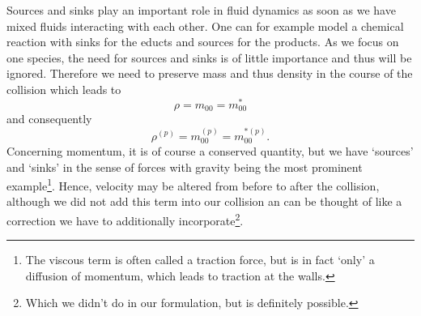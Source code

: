 Sources and sinks play an important role in fluid dynamics as soon as we have mixed fluids interacting with each other.
One can for example model a chemical reaction with sinks for the educts and sources for the products.
As we focus on one species, the need for sources and sinks is of little importance and thus will be ignored.
Therefore we need to preserve mass and thus density in the course of the collision which leads to
\begin{equation}
    \rho  = m_{00} = m_{00}^*
\end{equation}
and consequently
\begin{equation}
    \rho^{(p)} = m_{00}^{(p)} = m_{00}^{*(p)}.
\end{equation}
Concerning momentum, it is of course a conserved quantity, but we have `sources' and `sinks' in the sense of forces with gravity being the most prominent example\footnote{The viscous term is often called a traction force, but is in fact `only' a diffusion of momentum, which leads to traction at the walls.}.
Hence, velocity may be altered from before to after the collision, although we did not add this term into our collision an can be thought of like a correction we have to additionally incorporate\footnote{Which we didn't do in our formulation, but is definitely possible.}.
